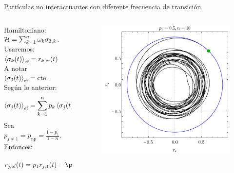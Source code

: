 \begin{frame}{Partículas no interactuantes con diferente frecuencia de transición}
    \begin{columns}
        \begin{column}{0.5\textwidth}
            Hamiltoniano: $\mathcal{H}=\sum_{k=1}^{n}\omega_{k}\sigma_{3,k}$.\\ \pause
            Usaremos: $\expval{\sigma_{k}(t)}_{\text{ef}}=r_{k,\text{ef}}(t)$\\ \pause
            A notar $\expval{\sigma_{3}(t)}_{\text{ef}}=\text{cte}$.\\ \pause
            Según lo anterior:
            \begin{equation}
                \expval{\sigma_{j}(t)}_{\text{ef}}=\sum_{k=1}^{n}p_{k}\expval{\sigma_{j}(t)}_{k}\nonumber
            \end{equation}\pause
            Sea $p_{j\neq 1}=p_{\text{np}}=\frac{1-p_{1}}{1-n}$. Entonces:\pause
            \begin{equation}
                r_{j,\ef}(t)=p_{1}r_{j,1}(t)-\pause p_{\text{np}}r_{\text{np}}\sum_{k=2}^{n}\sin(2\omega_{k} t-\phi_{j})\nonumber
        \end{equation}
        \end{column}
        \pause
        \begin{column}{0.5\textwidth}
            \begin{figure}
                \centering
                \includegraphics[width=1.\textwidth]{figures/maxent_results/local_all_ran_p=0.5_r=0.9_n=10_a=-3_b=3.pdf}
               \end{figure}
        \end{column}
    \end{columns}
\end{frame}

